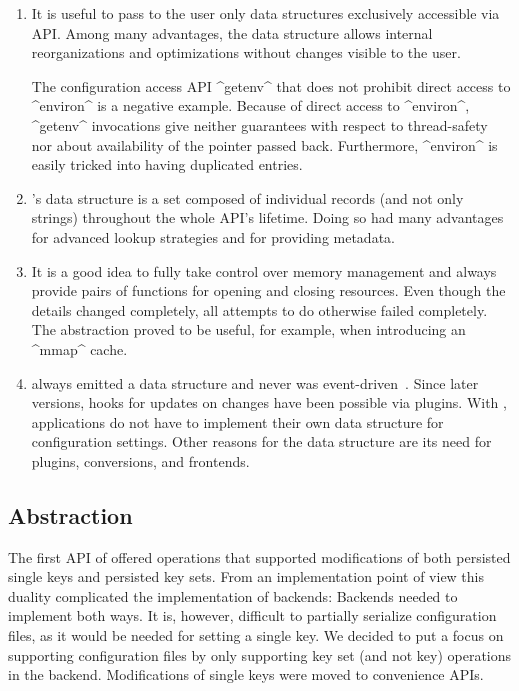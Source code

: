 \begin{enumerate}
\item
It is useful to pass to the user only data structures exclusively accessible via API.
Among many advantages, the data structure allows internal reorganizations and optimizations without changes visible to the user.
\begin{example}
The configuration access API ^getenv^ that does not prohibit direct access to ^environ^ is a negative example.
Because of direct access to ^environ^, ^getenv^ invocations give neither guarantees with respect to thread-safety nor about availability of the pointer passed back.
Furthermore, ^environ^ is easily tricked into having duplicated entries.
\end{example}


\item
\elektra{}'s data structure is a set composed of individual records (and not only strings) throughout the whole API's lifetime.
Doing so had many advantages for advanced lookup strategies and for providing metadata.

\item
It is a good idea to fully take control over memory management and always provide pairs of functions for opening and closing resources.
Even though the details changed completely, all attempts to do otherwise failed completely.
The abstraction proved to be useful, for example, when introducing an ^mmap^ cache.

\item
\elektra{} always emitted a data structure and never was event-driven~\cite{laemmel2011ast}.
Since later versions, hooks for updates on changes have been possible via plugins.
With \elektra{}, applications do not have to implement their own data structure for configuration settings.
Other reasons for the data structure are its need for plugins, conversions, and frontends.
\end{enumerate}


\subsection{Abstraction}

The first API of \elektra{} offered operations that supported modifications of both persisted single keys and persisted key sets.
From an implementation point of view this duality complicated the implementation of backends:
Backends needed to implement both ways.
It is, however, difficult to partially serialize configuration files, as it would be needed for setting a single key.
We decided to put a focus on supporting configuration files by only supporting key set (and not key) operations in the backend.
Modifications of single keys were moved to convenience APIs.

